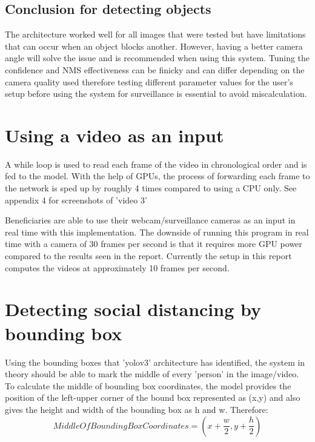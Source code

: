 \documentclass[12pt]{report}
\begin{document}
\subsection{Conclusion for detecting objects}

The architecture worked well for all images that were tested but have limitations that can occur when an object blocks another. However, having a better camera angle will solve the issue and is recommended when using this system. Tuning the confidence and NMS effectiveness can be finicky and can differ depending on the camera quality used therefore testing different parameter values for the user's setup before using the system for surveillance is essential to avoid miscalculation.

\section{Using a video as an input}

A while loop is used to read each frame of the video in chronological order and is fed to the model. With the help of GPUs, the process of forwarding each frame to the network is sped up by roughly 4 times compared to using a CPU only. See appendix 4 for screenshots of 'video 3'

\vspace{2mm}

Beneficiaries are able to use their webcam/surveillance cameras as an input in real time with this implementation. The downside of running this program in real time with a camera of 30 frames per second is that it requires more GPU power compared to the results seen in the report. Currently the setup in this report computes the videos at approximately 10 frames per second. 

\section{Detecting social distancing by bounding box}

Using the bounding boxes that 'yolov3' architecture has identified, the system in theory should be able to mark the middle of every 'person' in the image/video. To calculate the middle of bounding box coordinates, the model provides the position of the left-upper corner of the bound box represented as (x,y) and also gives the height and width of the bounding box as h and w. Therefore:
\begin{equation*}
Middle Of Bounding Box Coordinates = (x+\frac{w}{2}, y+\frac{h}{2})
\end{equation*}
\end{document}
